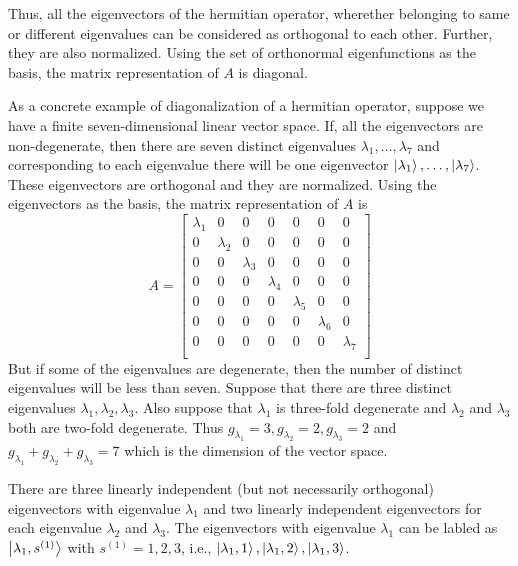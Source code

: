 	   
	   Thus, all the eigenvectors of the hermitian operator, wherether belonging to same or different eigenvalues can be considered as orthogonal to each other. Further, they are also normalized. Using the set of orthonormal eigenfunctions as the basis, the matrix representation of $A$ is diagonal.
	   
	   
	   
	   As a concrete example of diagonalization of a hermitian operator, suppose we have a finite seven-dimensional linear vector space. If, all the eigenvectors are non-degenerate, then there are seven distinct eigenvalues $\lambda_1, \ldots, \lambda_7$ and corresponding to each eigenvalue there will be one eigenvector $\ket{\lambda_1}, \ldots, \ket{\lambda_7}$. These eigenvectors are orthogonal and they are normalized. Using the eigenvectors as the basis, the matrix representation of $A$ is 
	   \begin{equation}
		   A = \left[
		   \begin{matrix}
	\lambda_1 & 0 & 0 & 0 & 0 & 0 & 0 \\
	0 & \lambda_2 & 0 & 0 & 0 & 0 & 0 \\
	0 & 0 & \lambda_3 & 0 & 0 & 0 & 0 \\
	0 & 0 & 0 & \lambda_4 & 0 & 0 & 0 \\
	0 & 0 & 0 & 0 & \lambda_5 & 0 & 0 \\
	0 & 0 & 0 & 0 & 0 & \lambda_6 & 0 \\
	0 & 0 & 0 & 0 & 0 & 0 & \lambda_7 \\
		   \end{matrix}
		   \right]
	   \end{equation}
	But if some of the eigenvalues are degenerate, then the number of distinct eigenvalues will be less than seven. Suppose that there are three distinct eigenvalues $\lambda_1, \lambda_2, \lambda_3$. Also suppose that $\lambda_1$ is three-fold degenerate and $\lambda_2$ and $\lambda_3$ both are two-fold degenerate. Thus $g_{\lambda_1}=3, g_{\lambda_2}=2, g_{\lambda_3}=2$ and $g_{\lambda_1} + g_{\lambda_2} + g_{\lambda_3}=7$ which is the dimension of the vector space.
	
	
	
	There are three linearly independent (but not necessarily orthogonal) eigenvectors with eigenvalue $\lambda_1$ and two linearly independent eigenvectors for each eigenvalue $\lambda_2$ and $\lambda_3$. The eigenvectors with eigenvalue $\lambda_1$ can be labled as 
	$\ket{\lambda_1, s^{(1)}}$ with $s^{(1)} = 1,2,3$, i.e., $\ket{\lambda_1,1}, \ket{\lambda_1,2}, \ket{\lambda_1,3}$.
	
